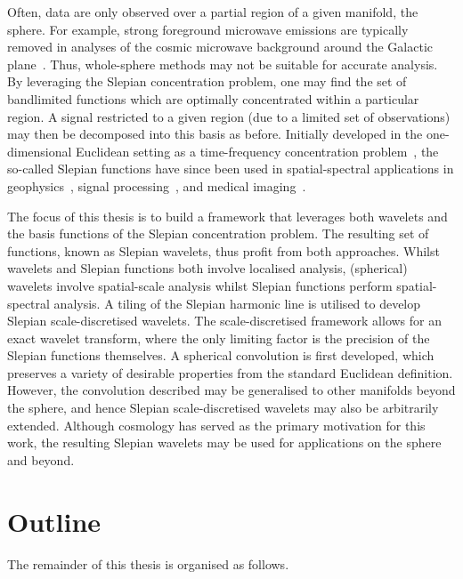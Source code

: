 Often, data are only observed over a partial region of a given manifold, \ie{} the sphere.
For example, strong foreground microwave emissions are typically removed in analyses of the cosmic microwave background around the Galactic plane~\cite{Mortlock2002}.
Thus, whole-sphere methods may not be suitable for accurate analysis.
By leveraging the Slepian concentration problem, one may find the set of bandlimited functions which are optimally concentrated within a particular region.
A signal restricted to a given region (due to a limited set of observations) may then be decomposed into this basis as before.
Initially developed in the one-dimensional Euclidean setting as a time-frequency concentration problem~\cite{Slepian1961,Landau1961,Landau1962}, the so-called Slepian functions have since been used in spatial-spectral applications in geophysics~\cite{Thomson1976,Simons2006a,Simons2011}, signal processing~\cite{Mathews1985,Thomson1982}, and medical imaging~\cite{Jackson1991}.

The focus of this thesis is to build a framework that leverages both wavelets and the basis functions of the Slepian concentration problem.
The resulting set of functions, known as Slepian wavelets, thus profit from both approaches.
Whilst wavelets and Slepian functions both involve localised analysis, (spherical) wavelets involve spatial-scale analysis whilst Slepian functions perform spatial-spectral analysis.
A tiling of the Slepian harmonic line is utilised to develop Slepian scale-discretised wavelets.
The scale-discretised framework allows for an exact wavelet transform, where the only limiting factor is the precision of the Slepian functions themselves.
A spherical convolution is first developed, which preserves a variety of desirable properties from the standard Euclidean definition.
However, the convolution described may be generalised to other manifolds beyond the sphere, and hence Slepian scale-discretised wavelets may also be arbitrarily extended.
Although cosmology has served as the primary motivation for this work, the resulting Slepian wavelets may be used for applications on the sphere and beyond.

\section{Outline}

The remainder of this thesis is organised as follows.

